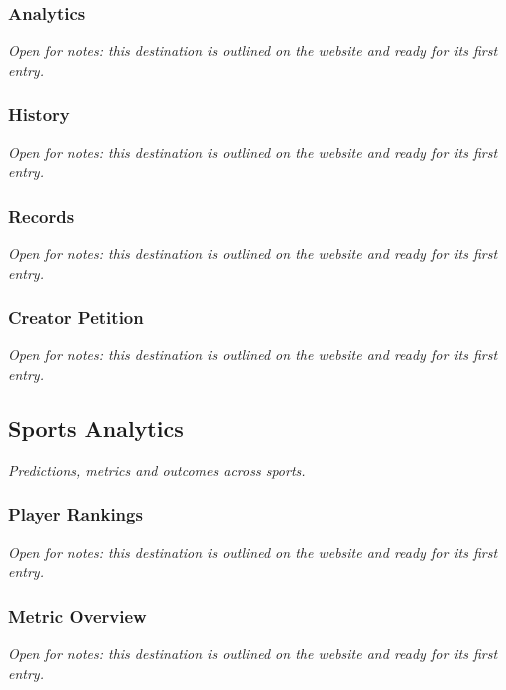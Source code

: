 \documentclass{article}
\begin{document}
\subsubsection{Analytics}\label{sec:series-hub-analytics}
\textit{Open for notes: this destination is outlined on the website and ready for its first entry.}

\subsubsection{History}\label{sec:series-hub-history}
\textit{Open for notes: this destination is outlined on the website and ready for its first entry.}

\subsubsection{Records}\label{sec:records}
\textit{Open for notes: this destination is outlined on the website and ready for its first entry.}

\subsubsection{Creator Petition}\label{sec:creator-petition}
\textit{Open for notes: this destination is outlined on the website and ready for its first entry.}

\subsection{Sports Analytics}\label{sec:sports-analytics}
\textit{Predictions, metrics and outcomes across sports.}

\subsubsection{Player Rankings}\label{sec:player-rankings}
\textit{Open for notes: this destination is outlined on the website and ready for its first entry.}

\subsubsection{Metric Overview}\label{sec:metric-overview}
\textit{Open for notes: this destination is outlined on the website and ready for its first entry.}
\end{document}
